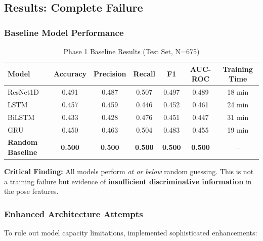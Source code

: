 \documentclass[11pt,a4paper]{article}
\begin{document}
\subsection{Results: Complete Failure}

\subsubsection{Baseline Model Performance}

\begin{table}[H]
\centering
\caption{Phase 1 Baseline Results (Test Set, N=675)}
\begin{tabular}{lcccccc}
\toprule
Model & Accuracy & Precision & Recall & F1 & AUC-ROC & Training Time \\
\midrule
ResNet1D & 0.491 & 0.487 & 0.507 & 0.497 & 0.489 & 18 min \\
LSTM & 0.457 & 0.459 & 0.446 & 0.452 & 0.461 & 24 min \\
BiLSTM & 0.433 & 0.428 & 0.476 & 0.451 & 0.447 & 31 min \\
GRU & 0.450 & 0.463 & 0.504 & 0.483 & 0.455 & 19 min \\
\midrule
\textbf{Random Baseline} & \textbf{0.500} & \textbf{0.500} & \textbf{0.500} & \textbf{0.500} & \textbf{0.500} & -- \\
\bottomrule
\end{tabular}
\end{table}

\textbf{Critical Finding:} All models perform \textit{at or below} random guessing. This is not a training failure but evidence of \textbf{insufficient discriminative information} in the pose features.

\subsubsection{Enhanced Architecture Attempts}

To rule out model capacity limitations, implemented sophisticated enhancements:
\end{document}
